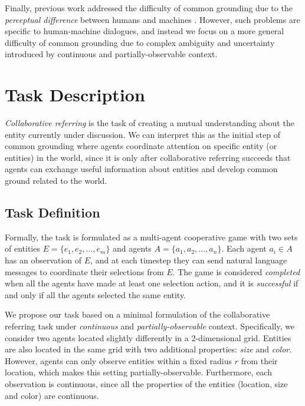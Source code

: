 \documentclass[letterpaper]{article} %
\begin{document}
Finally, previous work addressed the difficulty of common grounding due to the \emph{perceptual difference} between humans and machines \cite{liu2012perceptual,fang2015embodied}. However, such problems are specific to human-machine dialogues, and instead we focus on a more general difficulty of common grounding due to complex ambiguity and uncertainty introduced by continuous and partially-observable context.

\section{Task Description}
\label{section:task_description}

\emph{Collaborative referring} is the task of creating a mutual understanding about the entity currently under discussion. We can interpret this as the initial step of common grounding where agents coordinate attention on specific entity (or entities) in the world, since it is only after collaborative referring succeeds that agents can exchange useful information about entities and develop common ground related to the world.

\subsection{Task Definition}

Formally, the task is formulated as a multi-agent cooperative game with two sets of entities $E = \{e_1, e_2, ... , e_m\}$ and agents $A = \{a_1, a_2, ... , a_n\}$. Each agent $a_i \in A$ has an observation of $E$, and at each timestep they can send natural language messages to coordinate their selections from $E$. The game is considered \emph{completed} when all the agents have made at least one selection action, and it is \emph{successful} if and only if all the agents selected the same entity.

We propose our task based on a minimal formulation of the collaborative referring task under \emph{continuous} and \emph{partially-observable} context. Specifically, we consider two agents located slightly differently in a 2-dimensional grid. Entities are also located in the same grid with two additional properties: \emph{size} and \emph{color}. However, agents can only observe entities within a fixed radius $r$ from their location, which makes this setting partially-observable. Furthermore, each observation is continuous, since all the properties of the entities (location, size and color) are continuous.
\end{document}
